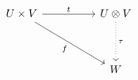\[
    \begin{tikzcd}
        U \times V \arrow[rr, "t"] \arrow[rrdd, "f"'] &  & U\otimes V \arrow[dd, "\tau", dotted] \\
                                                      &  &                                    \\
                                                      &  & W                                    
    \end{tikzcd}
\]